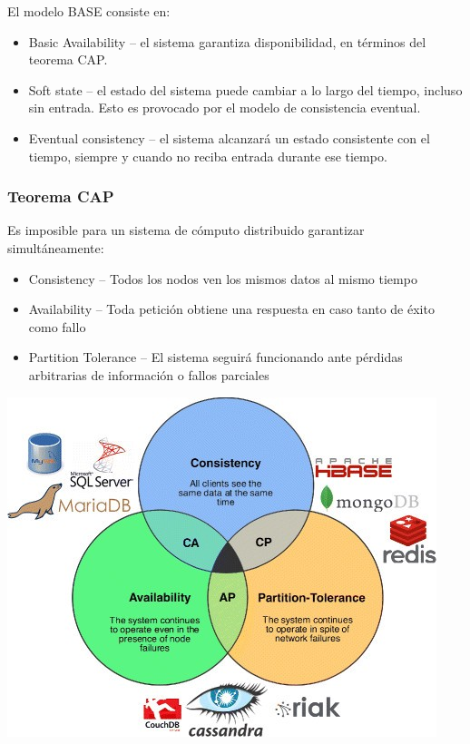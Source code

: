 \documentclass[
]{book}
\providecommand{\tightlist}{%
  \setlength{\itemsep}{0pt}\setlength{\parskip}{0pt}}
\begin{document}
El modelo BASE consiste en:

\begin{itemize}
\tightlist
\item
  Basic Availability -- el sistema garantiza disponibilidad, en términos del teorema CAP.
\item
  Soft state -- el estado del sistema puede cambiar a lo largo del tiempo, incluso sin entrada. Esto es provocado por el modelo de consistencia eventual.
\item
  Eventual consistency -- el sistema alcanzará un estado consistente con el tiempo, siempre y cuando no reciba entrada durante ese tiempo.
\end{itemize}

\hypertarget{teorema-cap}{%
\subsubsection{Teorema CAP}\label{teorema-cap}}

Es imposible para un sistema de cómputo distribuido garantizar simultáneamente:

\begin{itemize}
\tightlist
\item
  Consistency -- Todos los nodos ven los mismos datos al mismo tiempo
\item
  Availability -- Toda petición obtiene una respuesta en caso tanto de éxito como fallo
\item
  Partition Tolerance -- El sistema seguirá funcionando ante pérdidas arbitrarias de información o fallos parciales
\end{itemize}

\includegraphics{images/TeoremaCAP.jpg}
\end{document}
